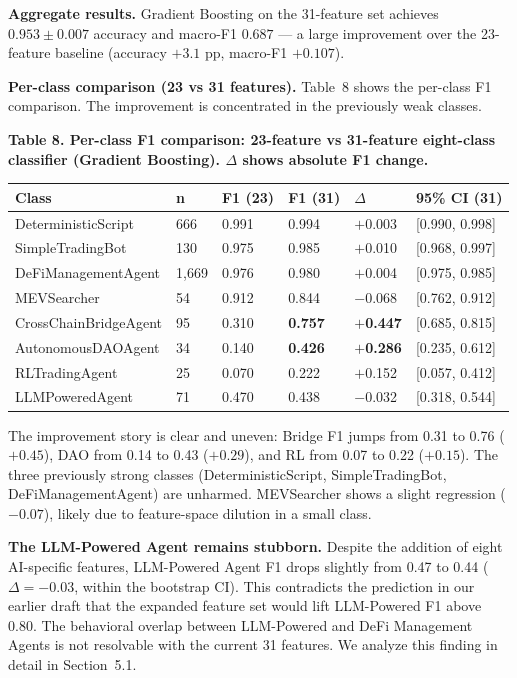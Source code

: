 \documentclass[sigconf,nonacm=false]{acmart}
\begin{document}
\textbf{Aggregate results.} Gradient Boosting on the 31-feature set achieves $0.953 \pm 0.007$ accuracy and macro-F1 $0.687$ --- a large improvement over the 23-feature baseline (accuracy $+3.1$ pp, macro-F1 $+0.107$).

\textbf{Per-class comparison (23 vs 31 features).} Table~8 shows the per-class F1 comparison. The improvement is concentrated in the previously weak classes.

\textbf{Table 8. Per-class F1 comparison: 23-feature vs 31-feature eight-class classifier (Gradient Boosting). $\Delta$ shows absolute F1 change.}

\begin{table}[h]
\centering
\small
\begin{tabular}{llllll}
\toprule
Class & n & F1 (23) & F1 (31) & $\Delta$ & 95\% CI (31) \\
\midrule
DeterministicScript & 666 & 0.991 & 0.994 & $+$0.003 & [0.990, 0.998] \\
SimpleTradingBot & 130 & 0.975 & 0.985 & $+$0.010 & [0.968, 0.997] \\
DeFiManagementAgent & 1,669 & 0.976 & 0.980 & $+$0.004 & [0.975, 0.985] \\
MEVSearcher & 54 & 0.912 & 0.844 & $-$0.068 & [0.762, 0.912] \\
CrossChainBridgeAgent & 95 & 0.310 & \textbf{0.757} & $+$\textbf{0.447} & [0.685, 0.815] \\
AutonomousDAOAgent & 34 & 0.140 & \textbf{0.426} & $+$\textbf{0.286} & [0.235, 0.612] \\
RLTradingAgent & 25 & 0.070 & 0.222 & $+$0.152 & [0.057, 0.412] \\
LLMPoweredAgent & 71 & 0.470 & 0.438 & $-$0.032 & [0.318, 0.544] \\
\bottomrule
\end{tabular}
\end{table}

The improvement story is clear and uneven: Bridge F1 jumps from 0.31 to 0.76 ($+0.45$), DAO from 0.14 to 0.43 ($+0.29$), and RL from 0.07 to 0.22 ($+0.15$). The three previously strong classes (DeterministicScript, SimpleTradingBot, DeFiManagementAgent) are unharmed. MEVSearcher shows a slight regression ($-0.07$), likely due to feature-space dilution in a small class.

\textbf{The LLM-Powered Agent remains stubborn.} Despite the addition of eight AI-specific features, LLM-Powered Agent F1 drops slightly from 0.47 to 0.44 ($\Delta = -0.03$, within the bootstrap CI). This contradicts the prediction in our earlier draft that the expanded feature set would lift LLM-Powered F1 above 0.80. The behavioral overlap between LLM-Powered and DeFi Management Agents is not resolvable with the current 31 features. We analyze this finding in detail in Section~5.1.
\end{document}
